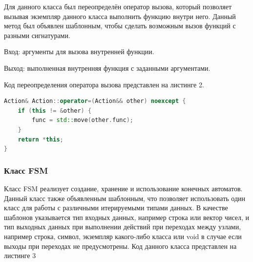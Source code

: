 \documentclass[a4paper,final]{article}
\begin{document}
Для данного класса был переопределён оператор вызова, который позволяет вызывая экземпляр данного класса выполнить функцию внутри него. Данный метод был объявлен шаблонным, чтобы сделать возможным вызов функций с разными сигнатурами.

Вход: аргументы для вызова внутренней функции.

Выход: выполненная внутренняя функция с заданными аргументами.

Код переопределения оператора вызова представлен на листинге 2.

\footnotesize{
\begin{lstlisting}[language=C++, caption = {Код переопределения оператора вызова}]
Action& Action::operator=(Action&& other) noexcept {
    if (this != &other) {
        func = std::move(other.func);
    }
    return *this;
}
\end{lstlisting}
}
\small

\subsubsection{Класс FSM}
Класс FSM реализует создание, хранение и использование конечных автоматов. Данный класс также объявленным шаблонным, что позволяет использовать один класс для работы с различными итерируемыми типами данных. В качестве шаблонов указывается тип входных данных, например строка или вектор чисел, и тип выходных данных при выполнении действий при переходах между узлами, например строка, символ, экземпляр какого-либо класса или void в случае если выходы при переходах не предусмотрены. Код данного класса представлен на листинге 3
\end{document}
